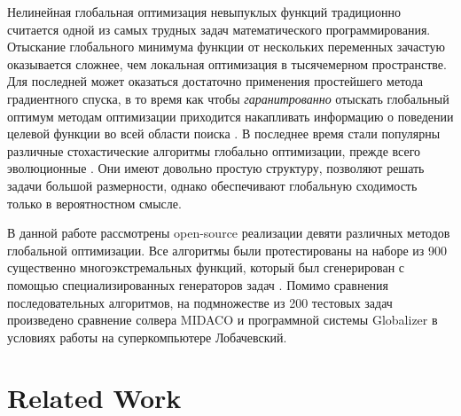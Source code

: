 \documentclass{svproc}
\begin{document}
\begin{Russian}
Нелинейная глобальная оптимизация невыпуклых функций традиционно считается одной из самых трудных
задач математического программирования. Отыскание глобального минимума функции от нескольких переменных
зачастую оказывается сложнее, чем локальная оптимизация в тысячемерном пространстве. Для последней может оказаться достаточно
применения простейшего метода градиентного спуска, в то время как чтобы \textit{гаранитрованно} отыскать глобальный оптимум методам
оптимизации приходится накапливать информацию о поведении целевой функции во всей области поиска \cite{Jones2009,Paulavicius2011,Evtushenko2013,strSergGO}. В последнее время стали популярны
различные стохастические алгоритмы глобально оптимизации, прежде всего эволюционные \cite{Storn1997, SCHLUTER2009, KennedyEberhart1995}. Они имеют довольно простую структуру, позволяют решать задачи большой размерности, однако обеспечивают глобальную сходимость только в вероятностном смысле.

В данной работе рассмотрены open-source реализации девяти различных методов глобальной оптимизации.
Все алгоритмы были протестированы на наборе из 900 существенно многоэкстремальных функций, который был сгенерирован с
помощью специализированных генераторов задач \cite{Gaviano2003, grishaginClass}. Помимо сравнения последовательных алгоритмов, на подмножестве из 200 тестовых задач произведено сравнение солвера MIDACO \cite{Schlueter2012} и программной системы Globalizer \cite{globalizerSystem} в условиях работы на суперкомпьютере Лобачевский.
\end{Russian}

\section{Related Work}
\end{document}

